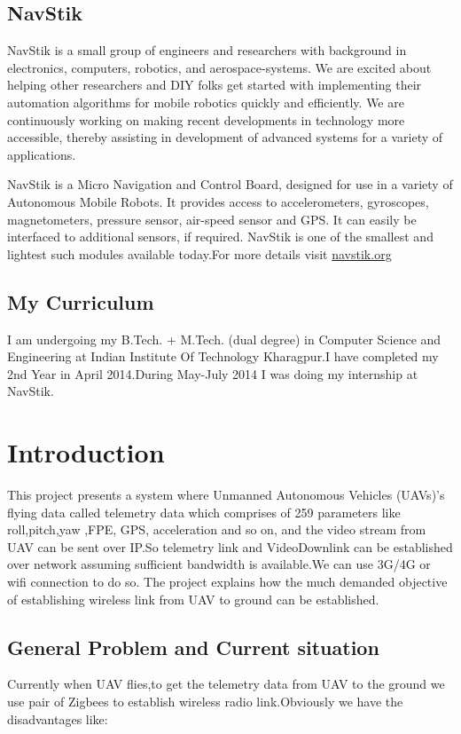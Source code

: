 \documentclass[12pt]{article}
\begin{document}
\subsection{NavStik}
NavStik is a small group of engineers and researchers with background in electronics, computers, robotics, and aerospace-systems. We are excited about helping other researchers and DIY folks get started with implementing their automation algorithms for mobile robotics quickly and efficiently. We are continuously working on making recent developments in technology more accessible, thereby assisting in development of advanced systems for a variety of applications.\par
NavStik is a Micro Navigation and Control Board, designed for use in a variety of Autonomous Mobile Robots. It provides access to accelerometers, gyroscopes, magnetometers, pressure sensor, air-speed sensor and GPS. It can easily be interfaced to additional sensors, if required. NavStik is one of the smallest and lightest such modules available today.For more details visit \url {navstik.org}
\subsection{My Curriculum}
I am undergoing my B.Tech. + M.Tech. (dual degree) in Computer Science and Engineering at Indian Institute Of Technology Kharagpur.I have completed my 2nd Year in April 2014.During May-July 2014 I was doing my internship at NavStik.\newpage
\section{Introduction}
This project presents a system where Unmanned Autonomous Vehicles (UAVs)'s flying data called telemetry data which comprises of 259 parameters like roll,pitch,yaw ,FPE, GPS, acceleration and so on, and the video stream from UAV can be sent over IP.So telemetry link and VideoDownlink can be established over network assuming sufficient bandwidth is available.We can use 3G/4G or wifi connection to do so.\newline
The project explains how the much demanded objective of establishing wireless link from UAV to ground can be established.

\subsection{General Problem and Current situation}
Currently when UAV flies,to get the telemetry data from UAV to the ground we use pair of Zigbees to establish wireless radio link.Obviously we have the disadvantages like:
\end{document}
